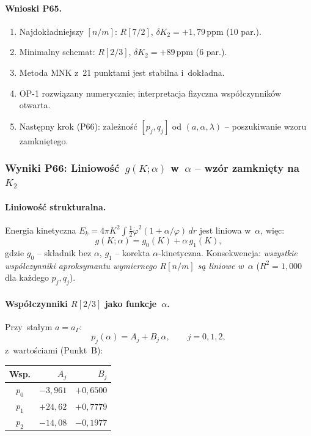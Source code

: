 \paragraph{Wnioski P65.}
\begin{enumerate}
  \item Najdok\l{}adniejszy $[n/m]$: $R[7/2]$, $\delta K_2=+1{,}79\,\mathrm{ppm}$ (10 par.).
  \item Minimalny schemat: $R[2/3]$, $\delta K_2=+89\,\mathrm{ppm}$ (6 par.).
  \item Metoda MNK z~21 punktami jest stabilna i~dok\l{}adna.
  \item OP-1 rozwi\k{a}zany numerycznie; interpretacja fizyczna wsp\'o\l{}czynnik\'ow otwarta.
  \item Nast\k{e}pny krok (P66): zale\.zno\'s\'c $[p_j,q_j]$ od $(a,\alpha,\lambda)$ --
        poszukiwanie wzoru zamkni\k{e}tego.
\end{enumerate}

\subsubsection{Wyniki P66: Liniowo\'s\'c~$g(K;\alpha)$ w~$\alpha$ -- wz\'or zamkni\k{e}ty na~$K_2$}
\label{app:F-P66}

\paragraph{Liniowo\'s\'c strukturalna.}
Energia kinetyczna
$E_k = 4\pi K^2\!\int\! \frac{1}{2}\dot\varphi^2(1+\alpha/\varphi)\,dr$
jest liniowa w~$\alpha$, wi\k{e}c:
\begin{equation}
  g(K;\alpha) = g_0(K) + \alpha\,g_1(K),
  \label{eq:g-linear-alpha}
\end{equation}
gdzie $g_0$ -- sk\l{}adnik bez $\alpha$, $g_1$ -- korekta $\alpha$-kinetyczna.
Konsekwencja: \emph{wszystkie wsp\'o\l{}czynniki aproksymantu wymiernego
$R[n/m]$ s\k{a} liniowe w~$\alpha$} ($R^2=1{,}000$ dla ka\.zdego $p_j, q_j$).

\paragraph{Wsp\'o\l{}czynniki $R[2/3]$ jako funkcje~$\alpha$.}
Przy~sta\l{}ym $a=a_\Gamma$:
\begin{equation}
  p_j(\alpha) = A_j + B_j\,\alpha, \qquad j=0,1,2,
\end{equation}
z~warto\'sciami (Punkt~B):
\begin{center}
\begin{tabular}{c|rr}
\hline
Wsp. & $A_j$ & $B_j$ \\
\hline
$p_0$ & $-3{,}961$ & $+0{,}6500$ \\
$p_1$ & $+24{,}62$ & $+0{,}7779$ \\
$p_2$ & $-14{,}08$ & $-0{,}1977$ \\
\hline
\end{tabular}
\end{center}

